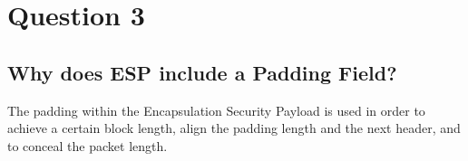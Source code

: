 \documentclass{report}
\begin{document}
	\section{Question 3}
	\startsection
		\renewcommand{\thesubsection}{\thesection.\Alph{subsection}}
		\subsection{Why does ESP include a Padding Field?}
		\startsubsection
			The padding within the Encapsulation Security Payload is used in order to achieve a certain block length, align the padding length and the next header, and to conceal the packet length.
		\closesection
	\closesection
\end{document}
